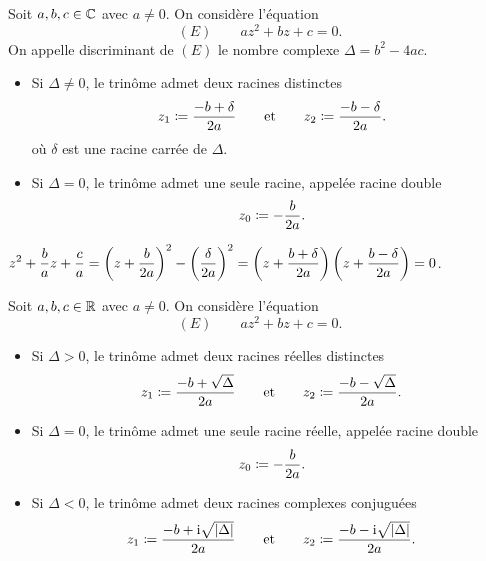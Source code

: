 \documentclass{magnoliaold}
\begin{document}
\begin{proposition}[utile=-3]
Soit $a,b,c\in\mathbb{C}$ avec $a\neq 0$.
On considère l'équation
  \[(E) \qquad az^2+bz+c=0.\]
  On appelle discriminant de $(E)$ le nombre complexe $\Delta=b^2-4ac$.
  \begin{itemize}
  \item Si $\Delta\not=0$, le trinôme admet deux racines distinctes
    \[z_1\coloneqq\frac{-b+\delta}{2a} \qquad \text{et} \qquad
      z_2\coloneqq\frac{-b-\delta}{2a}.\]
    où $\delta$ est une racine carrée de $\Delta$.
  \item Si $\Delta=0$, le trinôme admet une seule racine, appelée racine
    double
    \[z_0\coloneqq-\frac{b}{2a}.\]
  \end{itemize}
\end{proposition}

\begin{preuve}
$\displaystyle z^2+\frac{b}{a}z+\frac{c}{a}=\left(z+\frac{b}{2a}\right)^2-\left(\frac{\delta}{2a}\right)^2=\left(z+\frac{b+\delta}{2a}\right)\left(z+\frac{b-\delta}{2a}\right)=0$.
\end{preuve}

\begin{remarqueUnique}
\remarque Soit $a,b,c\in\mathbb{R}$ avec $a\neq 0$. On considère l'équation
  \[(E) \qquad az^2+bz+c=0.\]
  \begin{itemize}
  \item Si $\Delta>0$, le trinôme admet deux racines réelles distinctes
    \[z_1\coloneqq\frac{-b+\sqrt{\Delta}}{2a} \qquad \text{et} \qquad
      z_2\coloneqq\frac{-b-\sqrt{\Delta}}{2a}.\]
  \item Si $\Delta=0$, le trinôme admet une seule racine réelle, appelée racine
    double
    \[z_0\coloneqq-\frac{b}{2a}.\]
  \item Si $\Delta<0$, le trinôme admet deux racines complexes conjuguées
    \[z_1\coloneqq\frac{-b+{\rm i}\sqrt{\left|\Delta\right|}}{2a} \qquad \text{et} \qquad
      z_2\coloneqq\frac{-b-{\rm i}\sqrt{\left|\Delta\right|}}{2a}.\]
  \end{itemize}     
\end{remarqueUnique}
\end{document}
